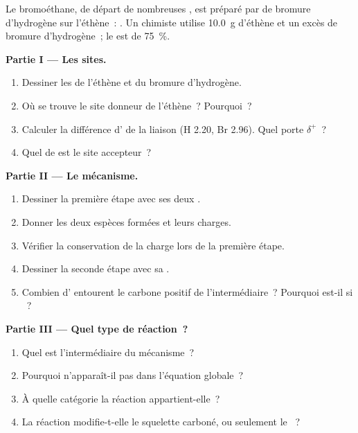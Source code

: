 \begin{problem}
\label{pb:g12:curly-arrows:1}
Le bromoéthane,  de départ de nombreuses , est préparé
par  de bromure d'hydrogène sur l'éthène~:
. Un chimiste
utilise \qty{10.0}{g} d'éthène et un excès de bromure d'hydrogène~; le
 est de \qty{75}{\percent}.

\medskip
\noindent\textbf{Partie I --- Les sites.}
\begin{enumerate}
  \item Dessiner les  de l'éthène et du bromure
        d'hydrogène.
  \item Où se trouve le site donneur de l'éthène~? Pourquoi~?
  \item Calculer la différence d' de la liaison
        (H 2.20, Br 2.96). Quel  porte $\delta^+$~?
  \item Quel  de  est le site accepteur~?
\end{enumerate}

\medskip
\noindent\textbf{Partie II --- Le mécanisme.}
\begin{enumerate}[resume]
  \item Dessiner la première étape avec ses deux .
  \item Donner les deux espèces formées et leurs charges.
  \item Vérifier la conservation de la charge lors de la première étape.
  \item Dessiner la seconde étape avec sa .
  \item Combien d' entourent le carbone positif de
        l'intermédiaire~? Pourquoi est-il si ~?
\end{enumerate}

\medskip
\noindent\textbf{Partie III --- Quel type de réaction~?}
\begin{enumerate}[resume]
  \item Quel est l'intermédiaire du mécanisme~?
  \item Pourquoi n'apparaît-il pas dans l'équation globale~?
  \item À quelle catégorie la réaction appartient-elle~?
  \item La réaction modifie-t-elle le squelette carboné, ou seulement le
        ~?
\end{enumerate}


\end{problem}
